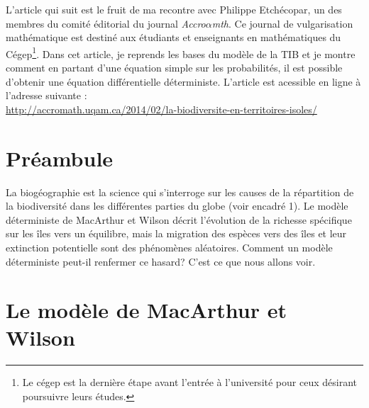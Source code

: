 \label{annI}
\addtocounter{chapter}{1}
\setcounter{equation}{0}



L'article qui suit est le fruit de ma recontre avec Philippe Etchécopar, un des membres du comité éditorial du journal \emph{Accro$\alpha$mth}.
Ce journal de vulgarisation mathématique est destiné aux étudiants et enseignants en mathématiques du Cégep\footnote{Le cégep est la dernière étape avant l'entrée à l'université pour ceux désirant poursuivre leurs études.}.
Dans cet article, je reprends les bases du modèle de la TIB et je montre comment en partant d'une équation simple sur les probabilités, il est possible d'obtenir une équation différentielle déterministe. L'article est acessible en ligne à l'adresse suivante : \\ \url{http://accromath.uqam.ca/2014/02/la-biodiversite-en-territoires-isoles/}


\section{Préambule}
	La biogéographie est la science qui s’interroge sur les causes de la répartition de la biodiversité dans les différentes parties du globe (voir encadré 1). Le modèle déterministe de MacArthur et Wilson décrit l’évolution de la richesse spécifique sur les îles vers un équilibre, mais la migration des espèces vers des îles et leur extinction potentielle sont des phénomènes aléatoires. Comment un modèle déterministe peut-il renfermer ce hasard? C’est ce que nous allons voir.

\section{Le modèle de MacArthur et Wilson}

